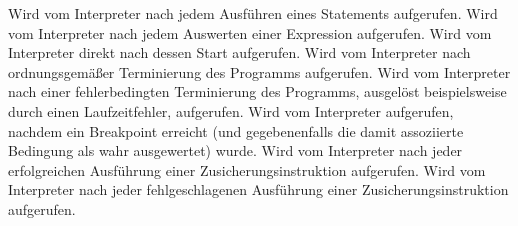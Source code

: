 \begin{description}
    Wird vom Interpreter nach jedem Ausführen eines Statements aufgerufen.
    Wird vom Interpreter nach jedem Auswerten einer Expression aufgerufen.
    Wird vom Interpreter direkt nach dessen Start aufgerufen.
    Wird vom Interpreter nach ordnungsgemäßer Terminierung des Programms aufgerufen.
    Wird vom Interpreter nach einer fehlerbedingten Terminierung des Programms, ausgelöst beispielsweise durch einen Laufzeitfehler, aufgerufen.
    Wird vom Interpreter aufgerufen, nachdem ein Breakpoint erreicht (und gegebenenfalls die damit assoziierte Bedingung als wahr ausgewertet) wurde.
    Wird vom Interpreter nach jeder erfolgreichen Ausführung einer Zusicherungsinstruktion aufgerufen.
    Wird vom Interpreter nach jeder fehlgeschlagenen Ausführung einer Zusicherungsinstruktion aufgerufen.
\end{description}

